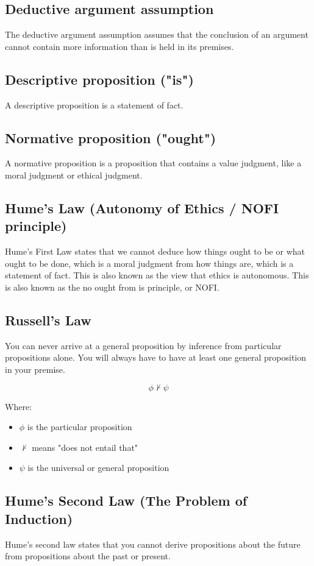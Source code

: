\documentclass[11pt]{article}
\begin{document}
\subsection{Deductive argument assumption}
\label{sec:orgde5f26e}
The deductive argument assumption assumes that the conclusion of an argument cannot contain more information than is held in its premises.
\subsection{Descriptive proposition ("is")}
\label{sec:orgcf13e86}
A descriptive proposition is a statement of fact.
\subsection{Normative proposition ("ought")}
\label{sec:org431ec27}
A normative proposition is a proposition that contains a value judgment, like a moral judgment or ethical judgment.
\subsection{Hume's Law (Autonomy of Ethics / NOFI principle)}
\label{sec:orgb83832a}
Hume's First Law states that we cannot deduce how things ought to be or what ought to be done, which is a moral judgment from how things are, which is a statement of fact. This is also known as the view that ethics is autonomous. This is also known as the no ought from is principle, or NOFI.
\subsection{Russell's Law}
\label{sec:org5b2fdd4}
You can never arrive at a general proposition by inference from particular propositions alone. You will always have to have at least one general proposition in your premise.

\[\phi \nvdash \psi\]

Where:
\begin{itemize}
\item \(\phi\) is the particular proposition
\item \(\nvdash\) means "does not entail that"
\item \(\psi\) is the universal or general proposition
\end{itemize}
\subsection{Hume's Second Law (The Problem of Induction)}
\label{sec:org712d715}
Hume's second law states that you cannot derive propositions about the future from propositions about the past or present.
\end{document}
